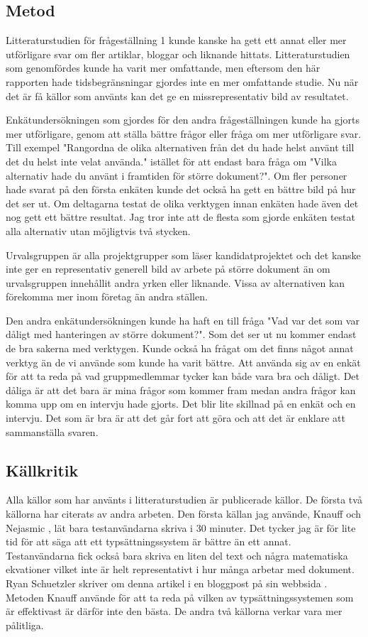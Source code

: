 \subsection{Metod}
Litteraturstudien för frågeställning 1 kunde kanske ha gett ett annat eller mer utförligare svar om fler artiklar, bloggar och liknande hittats. Litteraturstudien som genomfördes kunde ha varit mer omfattande, men eftersom den här rapporten hade tidsbegränsningar gjordes inte en mer omfattande studie. Nu när det är få källor som använts kan det ge en missrepresentativ bild av resultatet.

Enkätundersökningen som gjordes för den andra frågeställningen kunde ha gjorts mer utförligare, genom att ställa bättre frågor eller fråga om mer utförligare svar. Till exempel "Rangordna de olika alternativen från det du hade helst använt till det du helst inte velat använda." istället för att endast bara fråga om "Vilka alternativ hade du använt i framtiden för större dokument?". Om fler personer hade svarat på den första enkäten kunde det också ha gett en bättre bild på hur det ser ut. Om deltagarna testat de olika verktygen innan enkäten hade även det nog gett ett bättre resultat. Jag tror inte att de flesta som gjorde enkäten testat alla alternativ utan möjligtvis två stycken.

Urvalsgruppen är alla projektgrupper som läser kandidatprojektet och det kanske inte ger en representativ generell bild av arbete på större dokument än om urvalsgruppen innehållit andra yrken eller liknande. Vissa av alternativen kan förekomma mer inom företag än andra ställen.

Den andra enkätundersökningen kunde ha haft en till fråga "Vad var det som var dåligt med hanteringen av större dokument?". Som det ser ut nu kommer endast de bra sakerna med verktygen. Kunde också ha frågat om det finns något annat verktyg än de vi använde som kunde ha varit bättre. Att använda sig av en enkät för att ta reda på vad gruppmedlemmar tycker kan både vara bra och dåligt. Det dåliga är att det bara är mina frågor som kommer fram medan andra frågor kan komma upp om en intervju hade gjorts. Det blir lite skillnad på en enkät och en intervju. Det som är bra är att det går fort att göra och att det är enklare att sammanställa svaren.

\subsection{Källkritik}
Alla källor som har använts i litteraturstudien är publicerade källor. De första två källorna har citerats av andra arbeten. Den första källan jag använde, Knauff och Nejasmic \cite{knauff2014efficiency}, lät bara testanvändarna skriva i 30 minuter. Det tycker jag är för lite tid för att säga att ett typsättningssystem är bättre än ett annat. Testanvändarna fick också bara skriva en liten del text och några matematiska ekvationer vilket inte är helt representativt i hur många arbetar med dokument. Ryan Schuetzler skriver om denna artikel i en bloggpost på sin webbsida \cite{ryan_sch}. Metoden Knauff använde för att ta reda på vilken av typsättningssystemen som är effektivast är därför inte den bästa. De andra två källorna verkar vara mer pålitliga.

